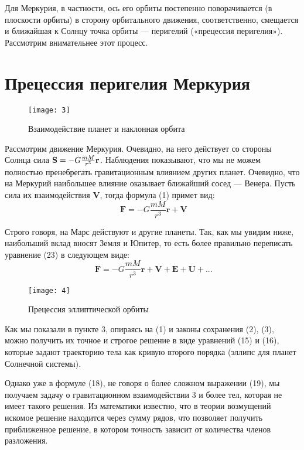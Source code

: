 \documentclass[12pt]{article}
\newcommand*{\hm}[1]{#1\nobreak\discretionary{}
	{\hbox{$\mathsurround=0pt #1$}}{}}
\begin{document}
 Для Меркурия, в частности, ось его орбиты постепенно поворачивается (в плоскости орбиты) в сторону орбитального движения, соответственно, смещается и ближайшая к Солнцу точка орбиты — перигелий («прецессия перигелия»). Рассмотрим внимательнее этот процесс.  
 
 \section{Прецессия перигелия Меркурия}

 \begin{wrapfigure}{l}{0.48\linewidth} 
  	\texttt{[image: 3]}
  	\caption{Взаимодействие планет и наклонная орбита}
  \end{wrapfigure}
 
 Рассмотрим движение Меркурия. Очевидно, на него действует со стороны Солнца сила $ \textbf{S} \hm{=} - G\frac{mM}{r^3}\textbf{r} $. Наблюдения показывают, что мы не можем полностью пренебрегать гравитационным влиянием других планет. Очевидно, что на Меркурий наибольшее влияние оказывает ближайший сосед --- Венера. Пусть сила их взаимодействия $ \textbf{V} $, тогда формула (1) примет вид: 
 \begin{equation}
\textbf{ F} = -G\dfrac{mM}{r^3}\textbf{r} + \textbf{V}
 \end{equation}
 
 Строго говоря, на Марс действуют и другие планеты. Так, как мы увидим ниже, наибольший вклад вносят Земля и Юпитер, то есть более правильно переписать уравнение (23) в следующем виде: 
 \begin{equation}
 \textbf{ F} = -G\dfrac{mM}{r^3}\textbf{r} + \textbf{V} + \textbf{E} + \textbf{U} + ...
 \end{equation}

  \begin{wrapfigure}{l}{0.38\linewidth} 
  	\texttt{[image: 4]}
  	\caption{Прецессия эллиптической орбиты}
  \end{wrapfigure}
 
 Как мы показали в пункте 3, опираясь на (1) и законы сохранения (2), (3), можно получить их точное и строгое решение в виде уравнений (15) и (16), которые задают траекторию тела как кривую второго порядка (эллипс для планет Солнечной системы).
 
 Однако уже в формуле (18), не говоря о более сложном выражении (19), мы получаем задачу о гравитационном взаимодействии 3 и более тел, которая не имеет такого решения.
 Из математики известно, что в теории возмущений искомое решение находится через сумму рядов, что позволяет получить приближенное решение, в котором точность зависит от количества членов разложения. 
 
\end{document}
